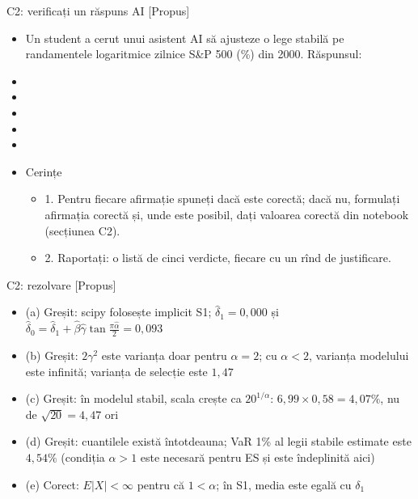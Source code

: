 \begin{frame}{C2: verificați un răspuns AI [Propus]}
\itemsize{\scriptsize}
\begin{itemize}
    \item Un student a cerut unui asistent AI să ajusteze o lege stabilă pe randamentele logaritmice zilnice S\&P 500 (\%) din 2000. Răspunsul:
    \item {}
    \item {}
    \item {}
    \item {}
    \item {}
    \item Cerințe
    \begin{itemize}
        \item 1. Pentru fiecare afirmație spuneți dacă este corectă; dacă nu, formulați afirmația corectă și, unde este posibil, dați valoarea corectă din notebook (secțiunea C2).
        \item 2. Raportați: o listă de cinci verdicte, fiecare cu un rînd de justificare.
    \end{itemize}
\end{itemize}
\end{frame}

\ifsolutions
\begin{frame}{C2: rezolvare [Propus]}
\itemsize{\footnotesize}
\begin{itemize}
    \item (a) Greșit: scipy folosește implicit S1; $\hat\delta_1 = 0{,}000$ și $\hat\delta_0 = \hat\delta_1 + \hat\beta\hat\gamma\tan\frac{\pi\hat\alpha}{2} = 0{,}093$
    \item (b) Greșit: $2\gamma^2$ este varianța doar pentru $\alpha = 2$; cu $\alpha < 2$, varianța modelului este infinită; varianța de selecție este $1{,}47$
    \item (c) Greșit: în modelul stabil, scala crește ca $20^{1/\alpha}$: $6{,}99 \times 0{,}58 = 4{,}07\%$, nu de $\sqrt{20} = 4{,}47$ ori
    \item (d) Greșit: cuantilele există întotdeauna; VaR 1\% al legii stabile estimate este $4{,}54\%$ (condiția $\alpha > 1$ este necesară pentru ES și este îndeplinită aici)
    \item (e) Corect: $E|X| < \infty$ pentru că $1 < \alpha$; în S1, media este egală cu $\delta_1$
\end{itemize}
\end{frame}
\fi


